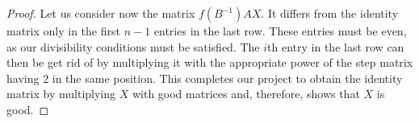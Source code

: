 \documentclass[10pt,a4paper]{amsart}
\begin{document}
\begin{proof}
Let us consider now the matrix $f(B^{-1})AX$. It differs from the identity matrix only in the first $n-1$ entries in the last row. These entries must be even, as our divisibility conditions must be satisfied. The $i$\/th entry in the last row can then be get rid of by multiplying it with the appropriate power of the step matrix having $2$ in the same position. This completes our project to obtain the identity matrix by multiplying $X$ with good matrices and, therefore, shows that $X$ is good.
\end{proof}
\end{document}
